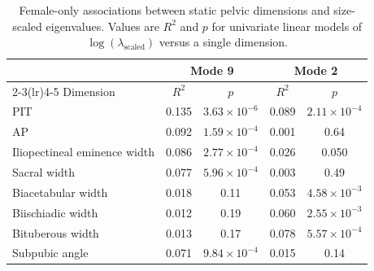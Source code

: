 \documentclass[openacc]{rsproca_new}
\begin{document}
\begin{table}[p]
\centering
\caption{Female-only associations between static pelvic dimensions and size-scaled eigenvalues. Values are $R^2$ and $p$ for univariate linear models of $\log(\lambda_{\mathrm{scaled}})$ versus a single dimension.}
\label{tab:staticassoc}
\begin{tabular}{lcccc}
\toprule
& \multicolumn{2}{c}{Mode 9} & \multicolumn{2}{c}{Mode 2} \\
\cmidrule(lr){2-3}\cmidrule(lr){4-5}
Dimension & $R^2$ & $p$ & $R^2$ & $p$ \\
\midrule
PIT & 0.135 & $3.63 \times 10^{-6}$ & 0.089 & $2.11 \times 10^{-4}$ \\
AP & 0.092 & $1.59 \times 10^{-4}$ & 0.001 & 0.64 \\
Iliopectineal eminence width & 0.086 & $2.77 \times 10^{-4}$ & 0.026 & 0.050 \\
Sacral width & 0.077 & $5.96 \times 10^{-4}$ & 0.003 & 0.49 \\
Biacetabular width & 0.018 & 0.11 & 0.053 & $4.58 \times 10^{-3}$ \\
Biischiadic width & 0.012 & 0.19 & 0.060 & $2.55 \times 10^{-3}$ \\
Bituberous width & 0.013 & 0.17 & 0.078 & $5.57 \times 10^{-4}$ \\
Subpubic angle & 0.071 & $9.84 \times 10^{-4}$ & 0.015 & 0.14 \\
\bottomrule
\end{tabular}
\end{table}
\end{document}
